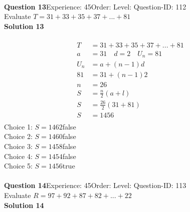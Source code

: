 \documentclass{article}
\begin{document}
\\[4pt]
\noindent\textbf{Question 13}\hspace{20pt}Experience: 45\hspace{20pt}Order: \hspace{20pt}Level: \hspace{20pt}Question-ID: 112\\[2pt]
Evaluate $T=31+33+35+37+...+81$\\[4pt]
\noindent\textbf{Solution 13}\\[2pt]
\\[-35pt]\begin{align*}
T&=31+33+35+37+...+81\\[2pt]
a&=31\quad d=2 \quad U_n=81\\[2pt]
U_n&=a+(n-1)d\\[2pt]
81&=31+(n-1)2\\[2pt]
n&=26\\[12pt]
S&=\displaystyle\frac{n}{2}(a+l)\\[2pt]
S&=\displaystyle\frac{26}{2}(31+81)\\[2pt]
S&=1456\\[-140pt]
\end{align*}
Choice 1: \hspace{20pt}$S=1462$\hspace{20pt}false\\
Choice 2: \hspace{20pt}$S=1460$\hspace{20pt}false\\
Choice 3: \hspace{20pt}$S=1458$\hspace{20pt}false\\
Choice 4: \hspace{20pt}$S=1454$\hspace{20pt}false\\
Choice 5: \hspace{20pt}$S=1456$\hspace{20pt}true\\
\\[4pt]
\noindent\textbf{Question 14}\hspace{20pt}Experience: 45\hspace{20pt}Order: \hspace{20pt}Level: \hspace{20pt}Question-ID: 113\\[2pt]
Evaluate $R=97+92+87+82+...+22$\\[4pt]
\noindent\textbf{Solution 14}\\[2pt]
\end{document}
